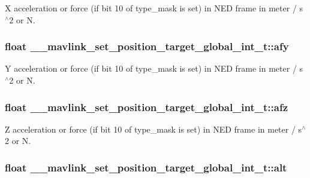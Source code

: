 X acceleration or force (if bit 10 of type\+\_\+mask is set) in N\+E\+D frame in meter / s$^\wedge$2 or N. 

\hypertarget{struct____mavlink__set__position__target__global__int__t_a3e2deef7e0f011c0dffebd22791b2830}{
\subsubsection[{afy}]{\setlength{\rightskip}{0pt plus 5cm}float \+\_\+\+\_\+mavlink\+\_\+set\+\_\+position\+\_\+target\+\_\+global\+\_\+int\+\_\+t\+::afy}}\label{struct____mavlink__set__position__target__global__int__t_a3e2deef7e0f011c0dffebd22791b2830}


Y acceleration or force (if bit 10 of type\+\_\+mask is set) in N\+E\+D frame in meter / s$^\wedge$2 or N. 

\hypertarget{struct____mavlink__set__position__target__global__int__t_ae423776f7a77472cc436b8bce2e3e987}{
\subsubsection[{afz}]{\setlength{\rightskip}{0pt plus 5cm}float \+\_\+\+\_\+mavlink\+\_\+set\+\_\+position\+\_\+target\+\_\+global\+\_\+int\+\_\+t\+::afz}}\label{struct____mavlink__set__position__target__global__int__t_ae423776f7a77472cc436b8bce2e3e987}


Z acceleration or force (if bit 10 of type\+\_\+mask is set) in N\+E\+D frame in meter / s$^\wedge$2 or N. 

\hypertarget{struct____mavlink__set__position__target__global__int__t_a2c8327dfe3c7bb4ed2b1ed406538d153}{
\subsubsection[{alt}]{\setlength{\rightskip}{0pt plus 5cm}float \+\_\+\+\_\+mavlink\+\_\+set\+\_\+position\+\_\+target\+\_\+global\+\_\+int\+\_\+t\+::alt}}\label{struct____mavlink__set__position__target__global__int__t_a2c8327dfe3c7bb4ed2b1ed406538d153}


